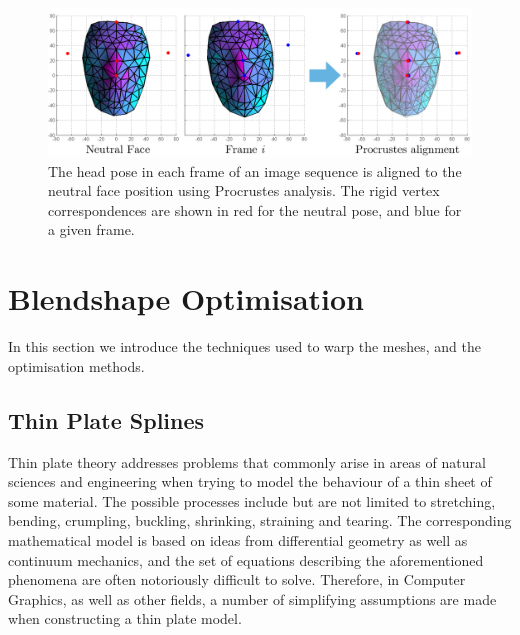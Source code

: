 \documentclass[11pt]{report}
\begin{document}
\begin{figure}[htbp!]
\centering
\includegraphics[width=\textwidth]{img/procrustes}
	\caption{The head pose in each frame of an image sequence is aligned to the neutral face position using Procrustes analysis. The rigid vertex correspondences are shown in red for the neutral pose, and blue for a given frame.}
	\label{fig:procrustes}
\end{figure}

\section{Blendshape Optimisation}
In this section we introduce the techniques used to warp the meshes, and the optimisation methods.

\subsection{Thin Plate Splines}
Thin plate theory addresses problems that commonly arise in areas of natural sciences and engineering when trying to model the behaviour of a thin sheet of some material. The possible processes include but are not limited to stretching, bending, crumpling, buckling, shrinking, straining and tearing. The corresponding mathematical model is based on ideas from differential geometry as well as continuum mechanics, and the set of equations describing the aforementioned phenomena are often notoriously difficult to solve. Therefore, in Computer Graphics, as well as other fields, a number of simplifying assumptions are made when constructing a thin plate model. 
\end{document}

